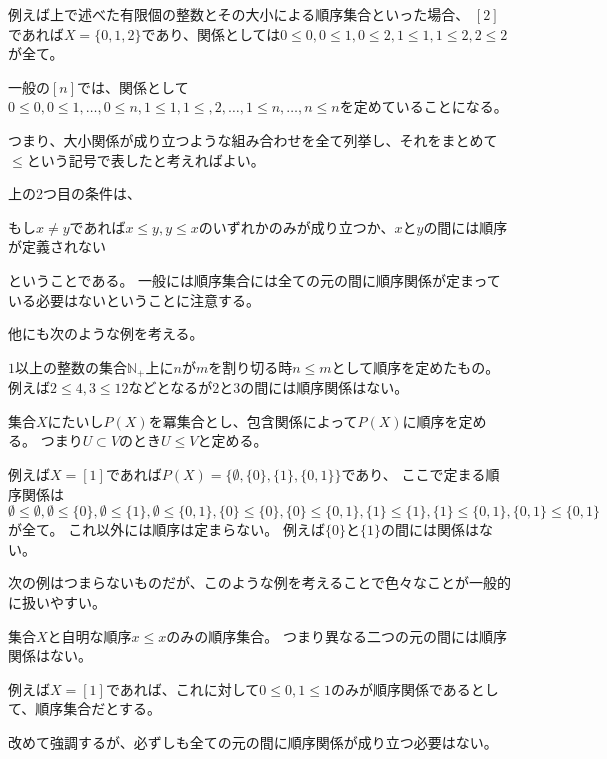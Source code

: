 \documentclass[uplatex]{jsarticle}
\begin{document}
\begin{eg}
例えば上で述べた有限個の整数とその大小による順序集合といった場合、
$[2]$であれば$X=\{0,1,2\}$であり、関係としては$0\leq0,0\leq1,0\leq2,1\leq1,1\leq2,2\leq2$が全て。

一般の$[n]$では、関係として$0\leq 0, 0\leq1,\ldots,0\leq n,1\leq1,1\leq,2,\ldots,1\leq n,\ldots,n\leq n$を定めていることになる。
\end{eg}

つまり、大小関係が成り立つような組み合わせを全て列挙し、それをまとめて$\leq$という記号で表したと考えればよい。

\begin{rem}
上の2つ目の条件は、
\begin{center}
もし$x\neq y$であれば$x\leq y, y\leq x$のいずれかのみが成り立つか、$x$と$y$の間には順序が定義されない
\end{center}
ということである。
一般には順序集合には全ての元の間に順序関係が定まっている必要はないということに注意する。
\end{rem}

他にも次のような例を考える。
\begin{eg}
$1$以上の整数の集合$\mathbb{N}_+$上に$n$が$m$を割り切る時$n\leq m$として順序を定めたもの。
例えば$2\leq 4, 3\leq 12$などとなるが$2$と$3$の間には順序関係はない。
\end{eg}

\begin{eg}
集合$X$にたいし$P(X)$を冪集合とし、包含関係によって$P(X)$に順序を定める。
つまり$U\subset V$のとき$U\leq V$と定める。

例えば$X=[1]$であれば$P(X)=\{\emptyset, \{0\}, \{1\}, \{0,1\}\}$であり、
ここで定まる順序関係は$\emptyset \leq \emptyset, \emptyset \leq \{0\}, \emptyset \leq \{1\}, \emptyset \leq \{0,1\}, \{0\} \leq \{0\}, \{0\} \leq \{0, 1\}, \{1\} \leq \{1\}, \{1\} \leq \{0,1\}, \{0, 1\} \leq \{0, 1\}$が全て。
これ以外には順序は定まらない。
例えば$\{0\}$と$\{1\}$の間には関係はない。
\end{eg}

次の例はつまらないものだが、このような例を考えることで色々なことが一般的に扱いやすい。
\begin{eg}
集合$X$と自明な順序$x\leq x$のみの順序集合。
つまり異なる二つの元の間には順序関係はない。

例えば$X=[1]$であれば、これに対して$0\leq0, 1\leq1$のみが順序関係であるとして、順序集合だとする。
\end{eg}

改めて強調するが、必ずしも全ての元の間に順序関係が成り立つ必要はない。
\end{document}

